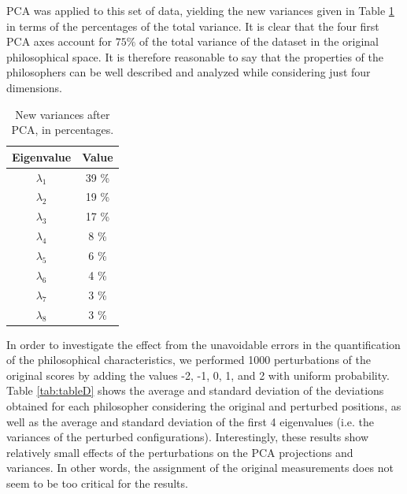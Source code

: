 \documentclass[%
 aip,
 jmp,%
 amsmath,amssymb,
 reprint,%
]{revtex4-1}
\begin{document}
PCA was applied to this set of data, yielding the new variances given
in Table \ref{tab:tableC} in terms of the percentages of the total
variance.  It is clear that the four first PCA axes account for
$75\%$ of the total variance of the dataset in the original
philosophical space.  It is therefore reasonable to say that the
properties of the philosophers can be well described and analyzed
while considering just four dimensions.


\begin{table}%
\caption{\label{tab:tableC}New variances after PCA, in percentages.}

\begin{tabular}{|c||c|}
\hline
Eigenvalue & Value \\ \hline
$\lambda_1$ &  39 \% \\
$\lambda_2$ &  19 \% \\
$\lambda_3$ &  17 \% \\
$\lambda_4$ &   8 \% \\
$\lambda_5$ &   6 \% \\
$\lambda_6$ &   4 \% \\
$\lambda_7$ &   3 \%    \\
$\lambda_8$ &   3 \%    \\
\hline

\end{tabular}
\end{table}

In order to investigate the effect from the unavoidable errors in the
quantification of the philosophical characteristics, we performed 1000
perturbations of the original scores by adding the values -2, -1, 0,
1, and 2 with uniform probability.  Table \ref{tab:tableD} shows the
average and standard deviation of the deviations obtained for each
philosopher considering the original and perturbed positions, as well
as the average and standard deviation of the first 4 eigenvalues
(i.e. the variances of the perturbed configurations).  Interestingly,
these results show relatively small effects of the perturbations on
the PCA projections and variances.  In other words, the assignment of
the original measurements does not seem to be too critical for the
results.
\end{document}
